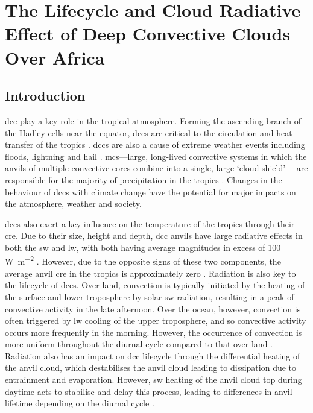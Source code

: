 \chapter{The Lifecycle and Cloud Radiative Effect of Deep Convective Clouds Over Africa} \label{chp:radiative_effect}

\section{Introduction}  %
\acrshort{dcc} play a key role in the tropical atmosphere. 
Forming the ascending branch of the Hadley cells near the equator, \acrshort{dcc}s are critical to the circulation and heat transfer of the tropics \citep{riehl_heat_1958, weisman_mesoscale_2015}. 
\acrshort{dcc}s are also a cause of extreme weather events including floods, lightning and hail \citep{westra_future_2014}. 
\acrshort{mcs}---large, long-lived convective systems in which the anvils of multiple convective cores combine into a single, large `cloud shield' \citep{chen_diurnal_1997, houze_mesoscale_2004, roca_simple_2017}---are responsible for the majority of precipitation in the tropics \citep{feng_global_2021}. 
Changes in the behaviour of \acrshort{dcc}s with climate change have the potential for major impacts on the atmosphere, weather and society.

\acrshort{dcc}s also exert a key influence on the temperature of the tropics through their \acrshort{cre}. 
Due to their size, height and depth, \acrshort{dcc} anvils have large radiative effects in both the \acrshort{sw} and \acrshort{lw}, with both having average magnitudes in excess of 100\,\unit{W m^{-2}} \citep{hartmann_tropical_2016, wall_balanced_2018}. 
However, due to the opposite signs of these two components, the average anvil \acrshort{cre} in the tropics is approximately zero \citep{ramanathan_cloud-radiative_1989, hartmann_effect_1992, stephens_cloudsat_2018}. 
Radiation is also key to the lifecycle of \acrshort{dcc}s. 
Over land, convection is typically initiated by the heating of the surface and lower troposphere by solar \acrshort{sw} radiation, resulting in a peak of convective activity in the late afternoon. 
Over the ocean, however, convection is often triggered by \acrshort{lw} cooling of the upper troposphere, and so convective activity occurs more frequently in the morning. 
However, the occurrence of convection is more uniform throughout the diurnal cycle compared to that over land \citep{taylor_evaluating_2017}. 
Radiation also has an impact on \acrshort{dcc} lifecycle through the differential heating of the anvil cloud, which destabilises the anvil cloud leading to dissipation due to entrainment and evaporation. 
However, \acrshort{sw} heating of the anvil cloud top during daytime acts to stabilise and delay this process, leading to differences in anvil lifetime depending on the diurnal cycle \citep{harrop_role_2016, sokol_tropical_2020, wall_observational_2020}.

